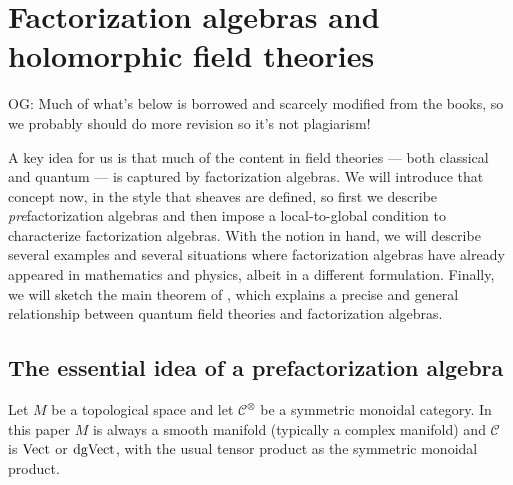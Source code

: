 \documentclass[11pt]{amsart}
\def\mc{\mathcal}
\def\owen#1{{\textcolor{violet!65!black}{OG: {#1}}}}
\begin{document}
\section{Factorization algebras and holomorphic field theories}
\label{prefactorization_algebras}

\owen{Much of what's below is borrowed and scarcely modified from the books, so we probably should do more revision so it's not plagiarism!}

A key idea for us is that much of the content in field theories --- both classical and quantum --- is captured by factorization algebras.
We will introduce that concept now, in the style that sheaves are defined, so first we describe {\em pre}\/factorization algebras and then impose a local-to-global condition to characterize factorization algebras.
With the notion in hand, we will describe several examples and several situations where factorization algebras have already appeared in mathematics and physics, 
albeit in a different formulation.
Finally, we will sketch the main theorem of \cite{CG2}, 
which explains a precise and general relationship between quantum field theories and factorization algebras.

\subsection{The essential idea of a prefactorization algebra}

Let $M$ be a topological space and let $\mc{C}^\otimes$ be a symmetric monoidal category. 
In this paper $M$ is always a smooth manifold (typically a complex manifold) and $\mc{C}$ is ${\rm Vect}$ or ${\rm dgVect}$, with the usual tensor product as the symmetric monoidal product.
\end{document}
